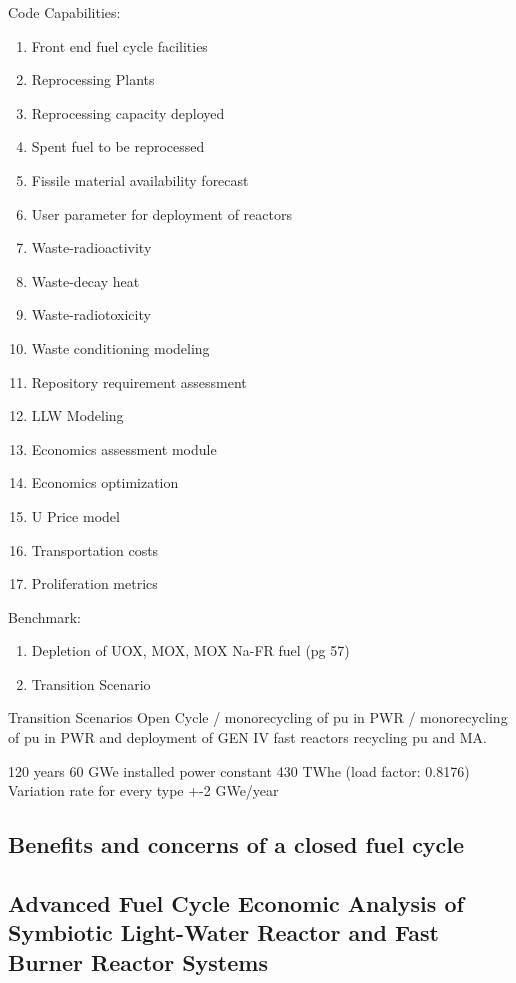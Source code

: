 Code Capabilities:
\begin{enumerate}
    \item Front end fuel cycle facilities
    \item Reprocessing Plants
    \item Reprocessing capacity deployed
    \item Spent fuel to be reprocessed
    \item Fissile material availability forecast
    \item User parameter for deployment of reactors
    \item Waste-radioactivity
    \item Waste-decay heat
    \item Waste-radiotoxicity
    \item Waste conditioning modeling
    \item Repository requirement assessment
    \item LLW Modeling
    \item Economics assessment module
    \item Economics optimization
    \item U Price model
    \item Transportation costs
    \item Proliferation metrics
\end{enumerate}

Benchmark:
\begin{enumerate}
    \item Depletion of UOX, MOX, MOX Na-FR fuel (pg 57)
    \item Transition Scenario
\end{enumerate}

Transition Scenarios
Open Cycle / monorecycling of pu in PWR / monorecycling of pu in PWR and
deployment of GEN IV fast reactors recycling pu and MA.

120 years
60 GWe installed power
constant 430 TWhe (load factor: 0.8176)
Variation rate for every type +-2 GWe/year



\subsection{Benefits and concerns of a closed fuel cycle}
\cite{widder_benefits_2010}


\subsection{Advanced Fuel Cycle Economic Analysis of Symbiotic Light-Water Reactor and Fast Burner Reactor Systems}
\cite{shropshire_advanced_2009}

